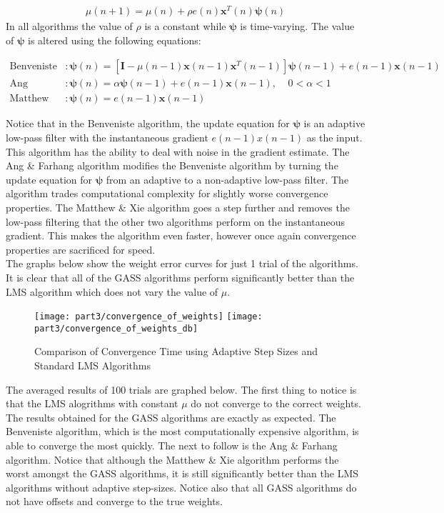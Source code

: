\begin{align*}
\mu(n+1)=\mu(n) + \rho e(n) \textbf{x}^T(n)\bm{\psi}(n)
\end{align*}
\newpage
\noindent{}In all algorithms the value of $\rho$ is a constant while $\bm{\psi}$ is time-varying. The value of $\bm{\psi}$ is altered using the following equations:

\begin{align*}
\text{Benveniste}&: \bm{\psi}(n)=[\textbf{I}-\mu(n-1)\textbf{x}(n-1)\textbf{x}^T(n-1)]\bm{\psi}(n-1) + e(n-1)\bm{x}(n-1) \\
\text{Ang \& Farhang}&: \bm{\psi}(n)=\alpha\bm{\psi}(n-1) + e(n-1)\bm{x}(n-1), \ \ \ \ \ 0 < \alpha < 1 \\
\text{Matthew \& Xie}&: \bm{\psi}(n)=e(n-1)\bm{x}(n-1)
\end{align*}

\noindent{}Notice that in the Benveniste algorithm, the update equation for $\bm{\psi}$ is an adaptive low-pass filter with the instantaneous gradient $e(n-1)x(n-1)$ as the input. This algorithm has the ability to deal with noise in the gradient estimate. The Ang \& Farhang algorithm modifies the Benveniste algorithm by turning the update equation for $\bm{\psi}$ from an adaptive to a non-adaptive low-pass filter. The algorithm trades computational complexity for slightly worse convergence properties. The Matthew \& Xie algorithm goes a step further and removes the low-pass filtering that the other two algorithms perform on the instantaneous gradient. This makes the algorithm even faster, however once again convergence properties are sacrificed for speed.\\

\noindent{}The graphs below show the weight error curves for just 1 trial of the algorithms. It is clear that all of the GASS algorithms perform significantly better than the LMS algorithm which does not vary the value of $\mu$.

\begin{figure}[H]
\centering{}
\texttt{[image: part3/convergence\_of\_weights]}
\texttt{[image: part3/convergence\_of\_weights\_db]}
\caption{Comparison of Convergence Time using Adaptive Step Sizes and Standard LMS Algorithms}
\end{figure}

\noindent{}The averaged results of 100 trials are graphed below. The first thing to notice is that the LMS alogrithms with constant $\mu$ do not converge to the correct weights. The results obtained for the GASS algorithms are exactly as expected. The Benveniste algorithm, which is the most computationally expensive algorithm, is able to converge the most quickly. The next to follow is the Ang \& Farhang algorithm. Notice that although the Matthew \& Xie algorithm performs the worst amongst the GASS algorithms, it is still significantly better than the LMS algorithms without adaptive step-sizes. Notice also that all GASS algorithms do not have offsets and converge to the true weights.


